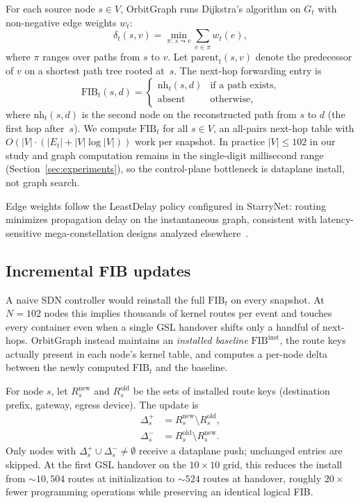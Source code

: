 For each source node $s \in V$, OrbitGraph runs Dijkstra's algorithm on
$G_t$ with non-negative edge weights $w_t$:
\begin{equation}
  \delta_t(s,v) = \min_{\pi:\, s \leadsto v} \sum_{e \in \pi} w_t(e),
  \label{eq:dist}
\end{equation}
where $\pi$ ranges over paths from $s$ to $v$.
Let $\mathrm{parent}_t(s,v)$ denote the predecessor of $v$ on a shortest
path tree rooted at~$s$.
The next-hop forwarding entry is
\begin{equation}
  \mathrm{FIB}_t(s,d) =
  \begin{cases}
    \mathrm{nh}_t(s,d) & \text{if a path exists}, \\
    \text{absent}      & \text{otherwise},
  \end{cases}
  \label{eq:fib}
\end{equation}
where $\mathrm{nh}_t(s,d)$ is the second node on the reconstructed path
from $s$ to $d$ (the first hop after~$s$).
We compute $\mathrm{FIB}_t$ for all $s \in V$, an all-pairs next-hop table
with $O(|V| \cdot (|E_t| + |V| \log |V|))$ work per snapshot.
In practice $|V| \le 102$ in our study and graph computation remains in
the single-digit millisecond range (Section~\ref{sec:experiments}), so the
control-plane bottleneck is dataplane install, not graph search.

Edge weights follow the LeastDelay policy configured in StarryNet: routing
minimizes propagation delay on the instantaneous graph, consistent with
latency-sensitive mega-constellation designs analyzed
elsewhere~\cite{handley:ground-relays:2019,lai2020starperf}.

\subsection{Incremental FIB updates}
\label{sec:incremental}

A naive SDN controller would reinstall the full $\mathrm{FIB}_t$ on every
snapshot.
At $N{=}102$ nodes this implies thousands of kernel routes per event and
touches every container even when a single GSL handover shifts only a handful of
next-hops.
OrbitGraph instead maintains an \emph{installed baseline}
$\mathrm{FIB}^{\mathrm{inst}}$, the route keys actually present in each
node's kernel table, and computes a per-node delta between the newly computed
$\mathrm{FIB}_t$ and the baseline.

For node $s$, let $R_s^{\mathrm{new}}$ and $R_s^{\mathrm{old}}$ be the sets of
installed route keys (destination prefix, gateway, egress device).
The update is
\begin{align}
  \Delta_s^{+} &= R_s^{\mathrm{new}} \setminus R_s^{\mathrm{old}},
  \label{eq:to-add}\\
  \Delta_s^{-} &= R_s^{\mathrm{old}} \setminus R_s^{\mathrm{new}}.
  \label{eq:to-del}
\end{align}
Only nodes with $\Delta_s^{+} \cup \Delta_s^{-} \neq \emptyset$ receive a
dataplane push; unchanged entries are skipped.
At the first GSL handover on the $10{\times}10$ grid, this reduces the install
from ${\sim}10{,}504$ routes at initialization to ${\sim}524$ routes at
handover, roughly $20\times$ fewer programming operations while preserving
an identical logical FIB.

